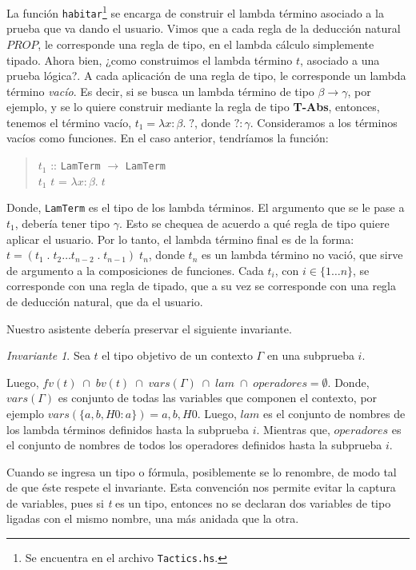 \documentclass[a4paper,11pt]{article}
\theoremstyle{definition}
\theoremstyle{remark}
\newtheorem{invariant}{Invariante}
\begin{document}
La función \texttt{habitar}\footnote{Se encuentra en el archivo \texttt{Tactics.hs}.} se encarga de construir el lambda término asociado 
a la prueba que va dando el usuario.
Vimos que a cada regla de la deducción natural $PROP$, le corresponde una regla de tipo, en el lambda cálculo simplemente
tipado. Ahora bien, ¿como construimos el lambda término $t$, asociado a una prueba lógica?.
A cada aplicación de una regla de tipo, le corresponde un lambda término \textit{vacío}.
Es decir, si se busca un lambda término de tipo $\beta \rightarrow \gamma$, por ejemplo, y se lo quiere construir mediante la regla 
de tipo \textbf{T-Abs}, entonces, tenemos el término vacío, $t_{1} = \lambda x:\beta. \; ?$, donde $? : \gamma$.
Consideramos a los términos vacíos como funciones. En el caso anterior, tendríamos la función:

\begin{verse}
  $t_{1}$ :: \texttt{LamTerm} $\rightarrow$  \texttt{LamTerm} \\
  $t_{1}$ $t$ = $\lambda x:\beta. \; t$
\end{verse}

Donde, \texttt{LamTerm} es el tipo de los lambda términos. El argumento que se le pase a $t_{1}$, debería tener tipo $\gamma$.
Esto se chequea de acuerdo a qué regla de tipo quiere aplicar el usuario.
Por lo tanto, el lambda término final es de la forma: $t = (t_{1} \; . \; t_{2} \dots t_{n-2} \; . \; t_{n-1}) \; t_{n}$, donde $t_{n}$ es un lambda término no vació, que sirve de argumento a la composiciones
de funciones. Cada $t_{i}$, con $i \in \{ 1 \dots n \}$, se corresponde con una regla de tipado, que a su vez se corresponde con una regla de deducción natural, 
que da el usuario.

Nuestro asistente debería preservar el siguiente invariante. 

\begin{invariant}
Sea $t$ el tipo objetivo de un contexto $\Gamma$ en una subprueba $i$. 

Luego, $fv(t) \; \cap \; bv(t) \; \cap \; vars(\Gamma) \; \cap \; lam \; \cap \; operadores = \emptyset$.
Donde, $vars(\Gamma)$ es conjunto de todas las variables que componen el contexto,
por ejemplo $vars(\{a,b,H0:a\})= {a,b,H0}$. Luego, $lam$ es el conjunto de nombres de los lambda términos definidos hasta
la subprueba $i$. Mientras que, $operadores$ es el conjunto de nombres de todos los operadores definidos hasta la subprueba $i$.  
\end{invariant}

Cuando se ingresa un tipo o fórmula, posiblemente se lo renombre, de modo tal de que éste respete el invariante.
Esta convención nos permite evitar la captura de variables, pues si \textit{t} es un tipo, entonces no se declaran 
dos variables de tipo ligadas con el mismo nombre, una más anidada que la otra.
\end{document}
